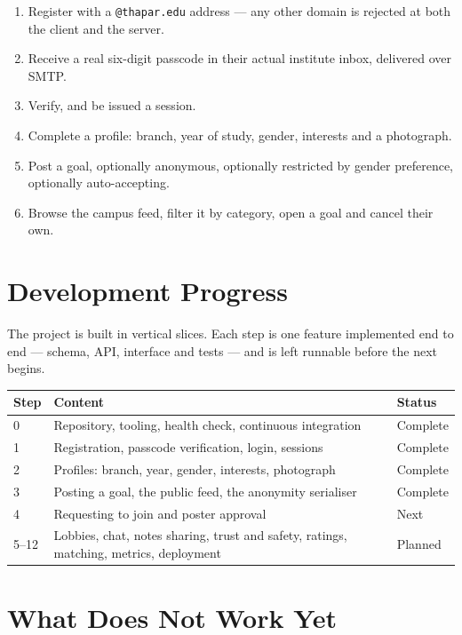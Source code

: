 \documentclass[twoside,12pt]{tietreport}
\begin{document}
\begin{enumerate}[leftmargin=*]
  \item Register with a \texttt{@thapar.edu} address --- any other domain is
    rejected at both the client and the server.
  \item Receive a real six-digit passcode in their actual institute inbox,
    delivered over SMTP.
  \item Verify, and be issued a session.
  \item Complete a profile: branch, year of study, gender, interests and a
    photograph.
  \item Post a goal, optionally anonymous, optionally restricted by gender
    preference, optionally auto-accepting.
  \item Browse the campus feed, filter it by category, open a goal and cancel
    their own.
\end{enumerate}

\section{Development Progress}

The project is built in vertical slices. Each step is one feature implemented end
to end --- schema, API, interface and tests --- and is left runnable before the
next begins.

\begin{longtable}{@{}p{1.6cm}p{8.6cm}p{3.0cm}@{}}
\toprule
\textbf{Step} & \textbf{Content} & \textbf{Status} \\
\midrule
\endhead
0 & Repository, tooling, health check, continuous integration & Complete \\
1 & Registration, passcode verification, login, sessions & Complete \\
2 & Profiles: branch, year, gender, interests, photograph & Complete \\
3 & Posting a goal, the public feed, the anonymity serialiser & Complete \\
4 & Requesting to join and poster approval & Next \\
5--12 & Lobbies, chat, notes sharing, trust and safety, ratings, matching,
        metrics, deployment & Planned \\
\bottomrule
\end{longtable}

\section{What Does Not Work Yet}
\end{document}
